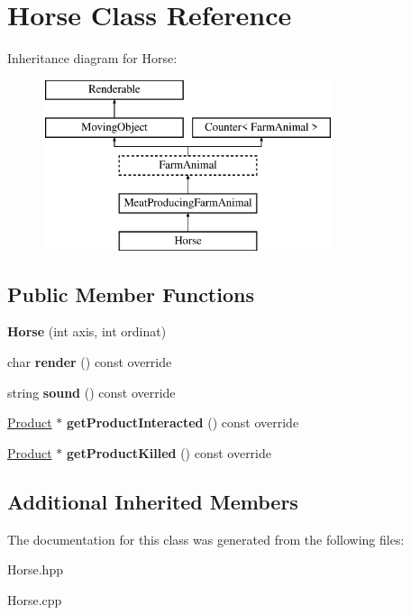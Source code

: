 \hypertarget{class_horse}{}\section{Horse Class Reference}
\label{class_horse}
Inheritance diagram for Horse\+:\begin{figure}[H]
\begin{center}
\leavevmode
\includegraphics[height=5.000000cm]{class_horse}
\end{center}
\end{figure}
\subsection*{Public Member Functions}
\begin{DoxyCompactItemize}
\item 
\mbox{\label{class_horse_aa4fe11bc94eb66049f57ade067d873ed}} 
{\bfseries Horse} (int axis, int ordinat)
\item 
\mbox{\label{class_horse_aa0d9cc201fa63963321caf542d5f5cc5}} 
char {\bfseries render} () const override
\item 
\mbox{\label{class_horse_a734d7fc161f5b44481ad43f58adf0fc4}} 
string {\bfseries sound} () const override
\item 
\mbox{\label{class_horse_abed8267adc98cccf51dd06d24ae82861}} 
\mbox{\hyperlink{class_product}{Product}} $\ast$ {\bfseries get\+Product\+Interacted} () const override
\item 
\mbox{\label{class_horse_ad20adb286e08e85f30802b9acda5a7de}} 
\mbox{\hyperlink{class_product}{Product}} $\ast$ {\bfseries get\+Product\+Killed} () const override
\end{DoxyCompactItemize}
\subsection*{Additional Inherited Members}


The documentation for this class was generated from the following files\+:\begin{DoxyCompactItemize}
\item 
Horse.\+hpp\item 
Horse.\+cpp\end{DoxyCompactItemize}
